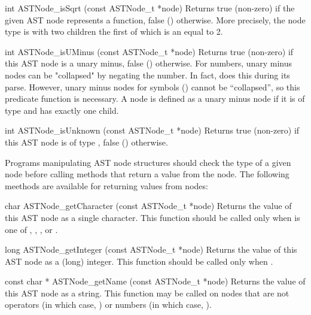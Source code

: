 \documentclass{sbmlmanual}
\begin{document}
\begin{methoddef}{int ASTNode\_isSqrt (const ASTNode\_t *node)}
  Returns true (non-zero) if the given AST node represents a 
  function, false () otherwise. 
  More precisely, the node type is  with two
  children the first of which is an  equal to 2.
\end{methoddef}


\begin{methoddef}{int ASTNode\_isUMinus (const ASTNode\_t *node)}
  Returns true (non-zero) if this AST node is a unary minus, false ()
  otherwise. 
  For numbers, unary minus nodes can be "collapsed" by negating the number.
  In fact,  does this during its parse.
  However, unary minus nodes for symbols () cannot be
  ``collapsed'', so this predicate function is necessary.
  A node is defined as a unary minus node if it is of type
   and has exactly one child.
\end{methoddef}


\begin{methoddef}{int ASTNode\_isUnknown (const ASTNode\_t *node)}
  Returns true (non-zero) if this AST node is of type ,
  false () otherwise.
\end{methoddef}



Programs manipulating AST node structures should check the type of a given
node before calling methods that return a value from the node.  The
following meethods are available for returning values from nodes:


\begin{methoddef}{char ASTNode\_getCharacter (const ASTNode\_t *node)}
  Returns the value of this AST node as a single character.  This function
  should be called only when  is one of
  , , ,
   or .
\end{methoddef}


\begin{methoddef}{long ASTNode\_getInteger (const ASTNode\_t *node)}
  Returns the value of this AST node as a (long) integer.  This function
  should be called only when .
\end{methoddef}


\begin{methoddef}{const char * ASTNode\_getName (const ASTNode\_t *node)}
  Returns the value of this AST node as a string.  This function may be
  called on nodes that are not operators (in which case,
  ) or numbers
  (in which case, ).
\end{methoddef}
\end{document}
